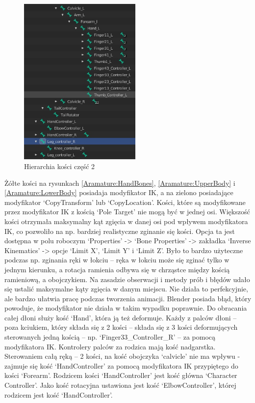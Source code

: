 \documentclass[12pt,twoside]{article}
\begin{document}
\begin{figure}[hbt!]

    \centering
	\includegraphics[width=6cm]{RealizacjaProjektu/MC/BoneHierarchy2.jpg}
	\caption{Hierarchia kości część 2}
    \label{Aramature:BoneHierarchy2}
\end{figure}
\hspace{0.10cm}
\linebreak
\linebreak
\linebreak
\linebreak
\linebreak
Żółte kości na rysunkach \ref{Aramature:HandBones}, \ref{Aramature:UpperBody} i
\ref{Aramature:LowerBody} posiadaja modyfikator IK, a na zielono posiadające
modyfikator `CopyTransform' lub `CopyLocation'. Kości, które są modyfikowane przez
modyfikator IK z kością `Pole Target' nie mogą być w jednej osi. Większość kości
otrzymała maksymalny kąt zgięcia w danej osi pod wpływem modyfikatora IK, co
pozwoliło na np. bardziej realistyczne zginanie się kości. Opcja ta jest
dostępna w polu roboczym `Properties' -> `Bone Properties' -> zakładka `Inverse
Kinematics' -> opcje `Limit X',  `Limit Y' i `Limit Z'. Było to bardzo użyteczne
podczas np. zginania ręki w łokciu -- ręka w łokciu może się zginać tylko w
jednym kierunku, a rotacja ramienia odbywa się w chrząstce między kością
ramieniową, a obojczykiem. Na zasadzie obserwacji i metody prób i błędów udało
się ustalić maksymalne kąty zgięcia w danym miejscu. Nie działa to perfekcyjnie,
ale bardzo ułatwia pracę podczas tworzenia animacji. Blender posiada błąd, który
powoduje, że modyfikator nie działa w takim wypadku poprawnie. Do obracania
całej dłoni służy kość `Hand', która ją też deformuje. Każdy z palców dłoni –
poza kciukiem, który składa się z 2 kości -- składa się z 3 kości deformujących
sterowanych jedną kością -- np. `Finger33\_Controller\_R' -- za pomocą
modyfikatora IK. Kontrolery palców za rodzica mają kość nadgarstka.
Sterowaniem całą ręką -- 2 kości, na kość obojczyka `calvicle' nie ma wpływu -
zajmuje się kość `HandController' za pomocą modyfikatora IK przypiętego do kości
`Forearm'. Rodzicem kości `HandController' jest kość główna `Character
Controller'. Jako kość rotacyjna ustawiona jest kość `ElbowController', której
rodzicem jest kość `HandController'. 
\end{document}
